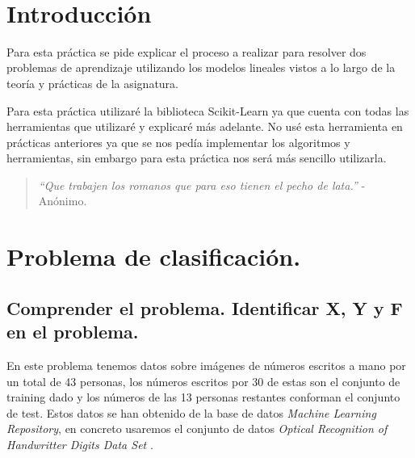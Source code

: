 \documentclass[12pt, spanish]{article}
\makeatletter
\let\thedate\@date
\makeatother
\begin{document}
\begin{titlepage}
    {\large \thedate}\\[0.5cm]
    {\doclicenseThis}
 	
    \vfill
    
\end{titlepage}


\tableofcontents
\pagebreak



\section*{Introducción}

Para esta práctica se pide explicar el proceso a realizar para resolver dos problemas de aprendizaje utilizando los modelos lineales vistos a lo largo de la teoría y prácticas de la asignatura.

Para esta práctica utilizaré la biblioteca Scikit-Learn\cite{sklearn} ya que cuenta con todas las herramientas que utilizaré y explicaré más adelante. No usé esta herramienta en prácticas anteriores ya que se nos pedía implementar los algoritmos y herramientas, sin embargo para esta práctica nos será más sencillo utilizarla.

\begin{quote}
\textit{``Que trabajen los romanos que para eso tienen el pecho de lata.''} -  Anónimo.
\end{quote}

\section{Problema de clasificación.}

\subsection{Comprender el problema. Identificar X, Y y F en el problema.}

En este problema tenemos datos sobre imágenes de números escritos a mano por un total de 43 personas, los números escritos por 30 de estas son el conjunto de training dado y los números de las 13 personas restantes conforman el conjunto de test. Estos datos se han obtenido de la base de datos \textit{Machine Learning Repository}, en concreto usaremos el conjunto de datos \textit{Optical Recognition of Handwritter Digits Data Set} \cite{mlr_digitos}.
\end{document}
